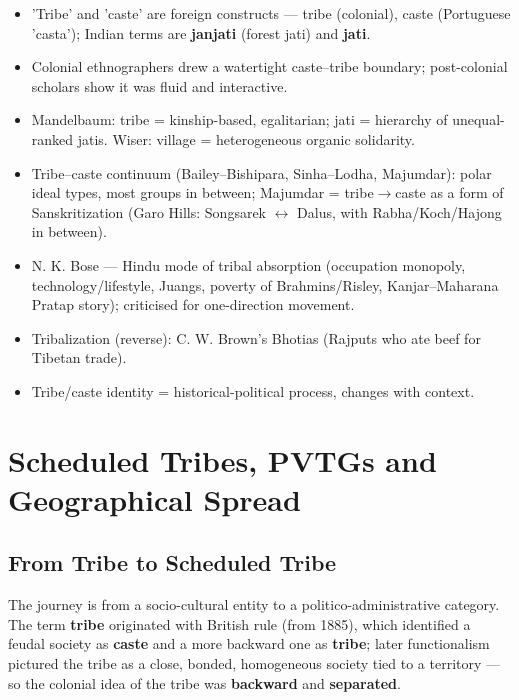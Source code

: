 \begin{QuickRevision}
\begin{itemize}
\item 'Tribe' and 'caste' are foreign constructs --- tribe (colonial), caste (Portuguese 'casta'); Indian terms are \textbf{janjati} (forest jati) and \textbf{jati}.
\item Colonial ethnographers drew a watertight caste--tribe boundary; post-colonial scholars show it was fluid and interactive.
\item Mandelbaum: tribe = kinship-based, egalitarian; jati = hierarchy of unequal-ranked jatis. Wiser: village = heterogeneous organic solidarity.
\item Tribe--caste continuum (Bailey--Bishipara, Sinha--Lodha, Majumdar): polar ideal types, most groups in between; Majumdar = tribe$\rightarrow$caste as a form of Sanskritization (Garo Hills: Songsarek $\leftrightarrow$ Dalus, with Rabha/Koch/Hajong in between).
\item N. K. Bose --- Hindu mode of tribal absorption (occupation monopoly, technology/lifestyle, Juangs, poverty of Brahmins/Risley, Kanjar--Maharana Pratap story); criticised for one-direction movement.
\item Tribalization (reverse): C. W. Brown's Bhotias (Rajputs who ate beef for Tibetan trade).
\item Tribe/caste identity = historical-political process, changes with context.
\end{itemize}
\end{QuickRevision}

\section{Scheduled Tribes, PVTGs and Geographical Spread}

\subsection{From Tribe to Scheduled Tribe}

The journey is from a socio-cultural entity to a politico-administrative category. The term \textbf{tribe} originated with British rule (from 1885), which identified a feudal society as \textbf{caste} and a more backward one as \textbf{tribe}; later functionalism pictured the tribe as a close, bonded, homogeneous society tied to a territory --- so the colonial idea of the tribe was \textbf{backward} and \textbf{separated}.

